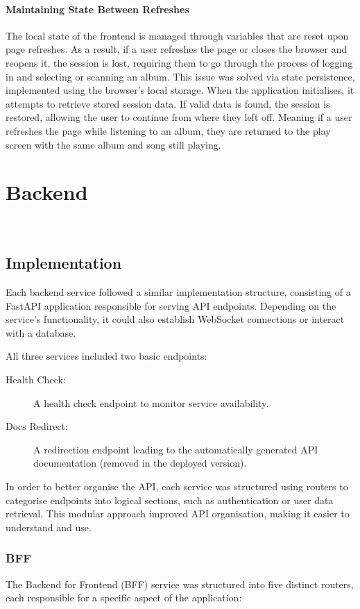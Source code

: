 \paragraph{Maintaining State Between Refreshes}
The local state of the frontend is managed through variables that are reset upon page refreshes. As a result, if a user refreshes the page or closes the browser and reopens it, the session is lost, requiring them to go through the process of logging in and selecting or scanning an album. This issue was solved via state persistence, implemented using the browser's local storage. When the application initialises, it attempts to retrieve stored session data. If valid data is found, the session is restored, allowing the user to continue from where they left off. Meaning if a user refreshes the page while listening to an album, they are returned to the play screen with the same album and song still playing.

\section{Backend}~\label{sec:backend-development}
\subsection{Implementation}
Each backend service followed a similar implementation structure, consisting of a FastAPI application responsible for serving API endpoints. Depending on the service's functionality, it could also establish WebSocket connections or interact with a database.

All three services included two basic endpoints:
\begin{description}
    \item[Health Check:] A health check endpoint to monitor service availability.
    \item[Docs Redirect:] A redirection endpoint leading to the automatically generated API documentation (removed in the deployed version).
\end{description}

In order to better organise the API, each service was structured using routers to categorise endpoints into logical sections, such as authentication or user data retrieval. This modular approach improved API organisation, making it easier to understand and use.

\subsubsection{BFF}
The Backend for Frontend (BFF) service was structured into five distinct routers, each responsible for a specific aspect of the application:

